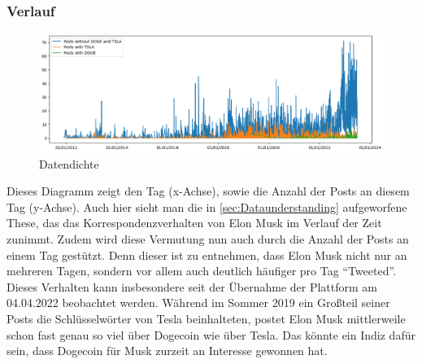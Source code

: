 \documentclass{article}
\begin{document}
\subsubsection{Verlauf}
\begin{figure}[!htb]
  	\includegraphics[width=\textwidth, center]{../imgs/Verlauf.png}
 	\caption{Datendichte}
 	\label{fig:Datendichte}
\end{figure}
Dieses Diagramm zeigt den Tag (x-Achse), sowie die Anzahl der Posts an diesem Tag (y-Achse). Auch hier sieht man die in \ref{sec:Dataunderstanding} aufgeworfene These, das das Korrespondenzverhalten von Elon Musk im Verlauf der Zeit zunimmt.
Zudem wird diese Vermutung nun auch durch die Anzahl der Posts an einem Tag gestützt.
Denn dieser ist zu entnehmen, dass Elon Musk nicht nur an mehreren Tagen, sondern vor allem auch deutlich häufiger pro Tag ``Tweeted''.
Dieses Verhalten kann insbesondere seit der Übernahme der Plattform am 04.04.2022 beobachtet werden.
Während im Sommer 2019 ein Großteil seiner Posts die Schlüsselwörter von Tesla beinhalteten, postet Elon Musk mittlerweile schon fast genau so viel über Dogecoin wie über Tesla. Das könnte ein Indiz dafür sein, dass Dogecoin für Musk zurzeit an Interesse gewonnen hat.
\end{document}
